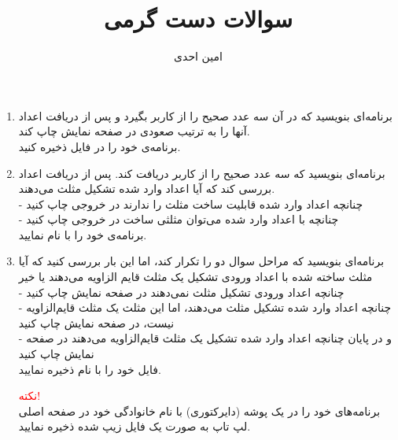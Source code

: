 \documentclass{article}
\title{سوالات دست گرمی}
\author{امین احدی}
\begin{document}
	\maketitle
	 \begin{enumerate}
	 	\item[\lr{Q1} ] برنامه‌ای بنویسید که در آن سه عدد صحیح را از کاربر بگیرد و پس از دریافت اعداد آنها را به ترتیب صعودی در صفحه نمایش چاپ کند.
	 \\	برنامه‌ی خود را در فایل  ذخیره کنید.
	 	\item[\lr{Q2}] برنامه‌ای بنویسید که سه عدد صحیح را از کاربر دریافت کند. پس از دریافت اعداد بررسی کند که آیا  اعداد وارد شده تشکیل مثلث می‌دهند. 
	 \\-	چنانچه اعداد وارد شده قابلیت ساخت مثلث را ندارند در خروجی چاپ کنید 
	 \\-	 چنانچه با اعداد وارد شده می‌توان مثلثی ساخت در خروجی چاپ کنید 
	 \\	برنامه‌ی خود را با نام  نمایید.
	 	
		\item[\lr{Q3}] برنامه‌ای بنویسید که مراحل سوال دو را تکرار کند، اما این بار بررسی کنید که آیا مثلث ساخته شده با اعداد ورودی  تشکیل یک مثلث قایم الزاویه می‌دهند یا خیر 
		\\-  چنانچه اعداد ورودی تشکیل مثلث نمی‌دهند در صفحه نمایش چاپ کنید 
	\\-	چنانچه اعداد وارد شده تشکیل مثلث می‌دهند، اما این مثلث یک مثلث قایم‌الزاویه نیست، در صفحه نمایش چاپ کنید
	\\-	و در پایان چنانچه اعداد وارد شده تشکیل یک مثلث قایم‌الزاویه می‌دهند در صفحه نمایش چاپ کنید
	\\	فایل خود را با نام  ذخیره نمایید.
		
		
		
	
		\textcolor{red}{نکته! }\\
		برنامه‌های خود را در یک پوشه (دایرکتوری) با نام خانوادگی خود در صفحه اصلی لپ تاپ  به صورت یک فایل زیپ شده ذخیره نمایید.
		
	 	
	 
	 \end{enumerate}
\end{document}
